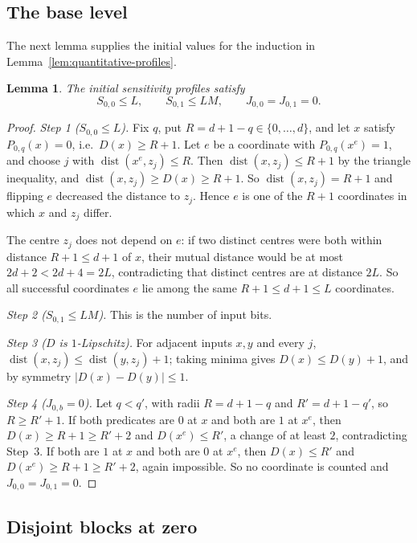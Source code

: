 \documentclass[11pt]{article}
\newcommand{\dist}{\operatorname{dist}}
\newtheorem{lemma}[theorem]{Lemma}
\theoremstyle{definition}
\theoremstyle{remark}
\begin{document}
\subsection{The base level}

The next lemma supplies the initial values for the induction in
Lemma~\ref{lem:quantitative-profiles}.

\begin{lemma}\label{lem:base}
The initial sensitivity profiles satisfy
\begin{equation}\label{eq:base-profile}
 S_{0,0}\le L,\qquad S_{0,1}\le LM,\qquad
 J_{0,0}=J_{0,1}=0.
\end{equation}
\end{lemma}
\begin{proof}
\emph{Step 1 (\(S_{0,0}\le L\)).} Fix \(q\), put \(R=d+1-q\in\{0,\ldots,d\}\),
and let \(x\) satisfy \(P_{0,q}(x)=0\), i.e.\ \(D(x)\ge R+1\). Let \(e\) be a
coordinate with \(P_{0,q}(x^e)=1\), and choose \(j\) with
\(\dist(x^e,z_j)\le R\). Then \(\dist(x,z_j)\le R+1\) by the triangle
inequality, and \(\dist(x,z_j)\ge D(x)\ge R+1\). So \(\dist(x,z_j)=R+1\) and
flipping \(e\) decreased the distance to \(z_j\). Hence \(e\) is one of the
\(R+1\) coordinates in which \(x\) and \(z_j\) differ.

The centre \(z_j\) does not depend on \(e\): if two distinct centres were
both within distance \(R+1\le d+1\) of \(x\), their mutual distance would be
at most \(2d+2<2d+4=2L\), contradicting that distinct centres are at
distance \(2L\). So all successful coordinates \(e\) lie among the same
\(R+1\le d+1\le L\) coordinates.

\emph{Step 2 (\(S_{0,1}\le LM\)).} This is the number of input bits.

\emph{Step 3 (\(D\) is \(1\)-Lipschitz).} For adjacent inputs \(x,y\) and
every \(j\), \(\dist(x,z_j)\le\dist(y,z_j)+1\); taking minima gives
\(D(x)\le D(y)+1\), and by symmetry \(|D(x)-D(y)|\le1\).

\emph{Step 4 (\(J_{0,b}=0\)).} Let \(q<q'\), with radii
\(R=d+1-q\) and \(R'=d+1-q'\), so \(R\ge R'+1\). If both predicates are \(0\)
at \(x\) and both are \(1\) at \(x^e\), then \(D(x)\ge R+1\ge R'+2\) and
\(D(x^e)\le R'\), a change of at least \(2\), contradicting Step~3. If both
are \(1\) at \(x\) and both are \(0\) at \(x^e\), then \(D(x)\le R'\) and
\(D(x^e)\ge R+1\ge R'+2\), again impossible. So no coordinate is counted and
\(J_{0,0}=J_{0,1}=0\).
\end{proof}

\subsection{Disjoint blocks at zero}
\end{document}

